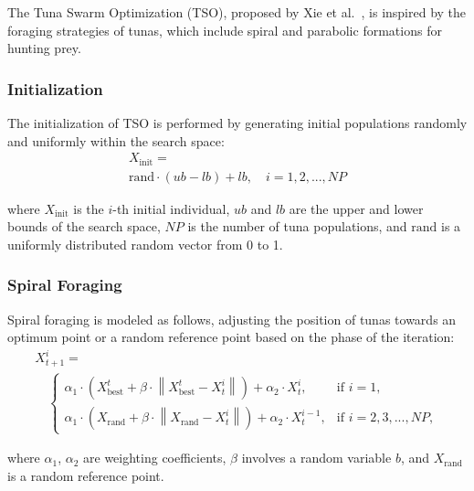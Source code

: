 \documentclass{elsarticle}
\begin{document}
\noindent The Tuna Swarm Optimization (TSO), proposed by Xie et al.~\cite{Xie2021}, is inspired by the foraging strategies of tunas, which include spiral and parabolic formations for hunting prey.

\subsubsection{Initialization}

\noindent The initialization of TSO is performed by generating initial populations randomly and uniformly within the search space:
\begin{equation}
    \begin{gathered}
        X_{\text{init}} = \\
        \text{rand} \cdot (ub - lb) + lb, \quad i = 1, 2, ..., NP
    \end{gathered}
\end{equation}

\noindent where $X_{\text{init}}$ is the $i$-th initial individual, $ub$ and $lb$ are the upper and lower bounds of the search space, $NP$ is the number of tuna populations, and $\text{rand}$ is a uniformly distributed random vector from 0 to 1.

\subsubsection{Spiral Foraging}
Spiral foraging is modeled as follows, adjusting the position of tunas towards an optimum point or a random reference point based on the phase of the iteration:
\begin{equation}
    \begin{gathered}
        X_{t+1}^i = \\
        \quad
        \begin{cases}
            \alpha_1 \cdot \left(X_{\text{best}}^t + \beta \cdot \left\lVert X_{\text{best}}^t - X_t^i \right\rVert \right) + \alpha_2 \cdot X_t^i, & \text{if } i = 1,\\
            \alpha_1 \cdot \left(X_{\text{rand}} + \beta \cdot \left\lVert X_{\text{rand}} - X_t^i \right\rVert \right) + \alpha_2 \cdot X_t^{i-1}, & \text{if } i = 2,3,...,NP,
        \end{cases}
    \end{gathered}
\end{equation}

where $\alpha_1$, $\alpha_2$ are weighting coefficients, $\beta$ involves a random variable $b$, and $X_{\text{rand}}$ is a random reference point.
\end{document}
